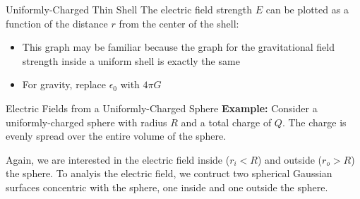 \documentclass[12pt,aspectratio=169]{beamer}
\begin{document}
\begin{frame}{Uniformly-Charged Thin Shell}
  The electric field strength $E$ can be plotted as a function of the distance
  $r$ from the center of the shell:
  \begin{center}
  \end{center}
  \begin{itemize}
  \item This graph may be familiar because the graph for the gravitational field
    strength inside a uniform shell is exactly the same
  \item For gravity, replace $\epsilon_0$ with $4\pi G$
  \end{itemize}
\end{frame}



\begin{frame}{Electric Fields from a Uniformly-Charged Sphere}
  \textbf{Example:} Consider a uniformly-charged sphere with radius $R$ and a
  total charge of $Q$. The charge is evenly spread over the entire volume of
  the sphere.
  \begin{center}
  \end{center}
  Again, we are interested in the electric field inside ($r_i<R$) and outside
  ($r_o>R$) the sphere. To analyis the electric field, we contruct two spherical
  Gaussian surfaces concentric with the sphere, one inside and one outside the
  sphere.
\end{frame}
\end{document}
